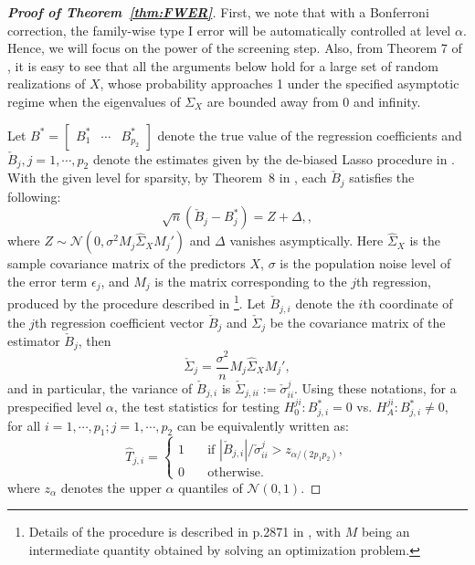 \begin{proof}[\textbf{Proof of Theorem~\ref{thm:FWER}}]
	First, we note that with a Bonferroni correction, the family-wise type I error will be automatically controlled at level $\alpha$. Hence, we will focus on the power of the screening step. Also, from Theorem 7 of \citet{javanmard2014confidence}, it is easy to see that all the arguments below hold for a large set of random realizations of $X$, whose probability approaches 1 under the specified asymptotic regime when the eigenvalues of $\Sigma_X$ are bounded away from $0$ and infinity.
	
	Let $B^*=\begin{bmatrix}
	B_1^* & \cdots & B_{p_2}^*
	\end{bmatrix}$ denote the true value of the regression coefficients and $\check{B}_j,j=1,\cdots,p_2$ denote the estimates given by the de-biased Lasso procedure in \citet{javanmard2014confidence}. With the given level for sparsity, by Theorem~8 in  \citet{javanmard2014confidence}, each $\check{B}_j$ satisfies the following:
	\begin{equation*}
	\sqrt{n}(\check{B}_j-B_j^*) = Z+\Delta, ,
	\end{equation*}
	where $Z\sim\mathcal{N}\left(0,\sigma^2 M_j\widehat{\Sigma}_XM_j'\right)$ and $\Delta$ vanishes asymptically. Here $\widehat{\Sigma}_X$ is the sample covariance matrix of the predictors $X$, $\sigma$ is the population noise level of the error term $\epsilon_j$, and $M_j$ is the matrix corresponding to the $j$th regression, produced by the procedure described in \citet{javanmard2014confidence}\footnote{Details of the procedure is described in p.2871 in \citet{javanmard2014confidence}, with $M$ being an intermediate quantity obtained by solving an optimization problem.}. Let $\check{B}_{j,i}$ denote the $i$th coordinate of the $j$th regression coefficient vector $\check{B}_j$ and $\check{\Sigma}_{j}$ be the covariance matrix of the estimator $\check{B}_j$, then 
	\begin{equation*}
	\check{\Sigma}_j = \frac{\sigma^2}{n}M_j\widehat{\Sigma}_XM_j',
	\end{equation*}
	and in particular, the variance of $\check{B}_{j,i}$ is $\check{\Sigma}_{j,ii}:=\check{\sigma}^j_{ii}$. Using these notations, for a prespecified level $\alpha$, the test statistics for testing $H^{ji}_0:B^*_{j,i}=0$ vs. $H^{ji}_A:B^*_{j,i}\neq 0$, for all $i=1,\cdots,p_1;j=1,\cdots,p_2$ can be equivalently written as: 
	\begin{equation*}
	\widehat{T}_{j,i} = \begin{cases}
	1 \quad &\text{if }|\check{B}_{j,i}|/\check{\sigma}^j_{ii}> z_{\alpha/(2p_1p_2)}, \\
	0 \quad &\text{otherwise.}
	\end{cases}
	\end{equation*}
	where $z_{\alpha}$ denotes the upper $\alpha$ quantiles of $\mathcal{N}(0,1)$. 
	

\end{proof}
